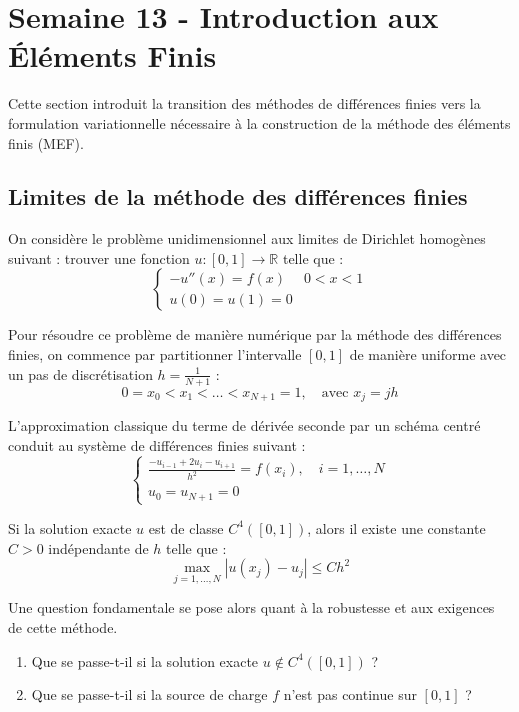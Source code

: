 \section{Semaine 13 - Introduction aux Éléments Finis}

Cette section introduit la transition des méthodes de différences finies vers la formulation variationnelle nécessaire à la construction de la méthode des éléments finis (MEF).

\subsection{Limites de la méthode des différences finies}

On considère le problème unidimensionnel aux limites de Dirichlet homogènes suivant : trouver une fonction $u: [0, 1] \to \mathbb{R}$ telle que :
\begin{equation}
\begin{cases}
-u''(x) = f(x) & 0 < x < 1 \\
u(0) = u(1) = 0
\end{cases}
\label{eq:strong_problem}
\end{equation}

Pour résoudre ce problème de manière numérique par la méthode des différences finies, on commence par partitionner l'intervalle $[0, 1]$ de manière uniforme avec un pas de discrétisation $h = \frac{1}{N+1}$ :
$$0 = x_0 < x_1 < \dots < x_{N+1} = 1, \quad \text{avec } x_j = j h$$

L'approximation classique du terme de dérivée seconde par un schéma centré conduit au système de différences finies suivant :
\begin{equation}
\begin{cases}
\frac{-u_{i-1} + 2u_i - u_{i+1}}{h^2} = f(x_i), \quad i = 1, \dots, N \\
u_0 = u_{N+1} = 0
\end{cases}
\end{equation}

\begin{theoreme}
Si la solution exacte $u$ est de classe $C^4([0, 1])$, alors il existe une constante $C > 0$ indépendante de $h$ telle que :
$$\max_{j=1, \dots, N} |u(x_j) - u_j| \le C h^2$$
\end{theoreme}

Une question fondamentale se pose alors quant à la robustesse et aux exigences de cette méthode.

\begin{explication}
\begin{enumerate}
    \item Que se passe-t-il si la solution exacte $u \notin C^4([0, 1])$ ? 
    \item Que se passe-t-il si la source de charge $f$ n'est pas continue sur $[0,1]$ ?
\end{enumerate}
\end{explication}

